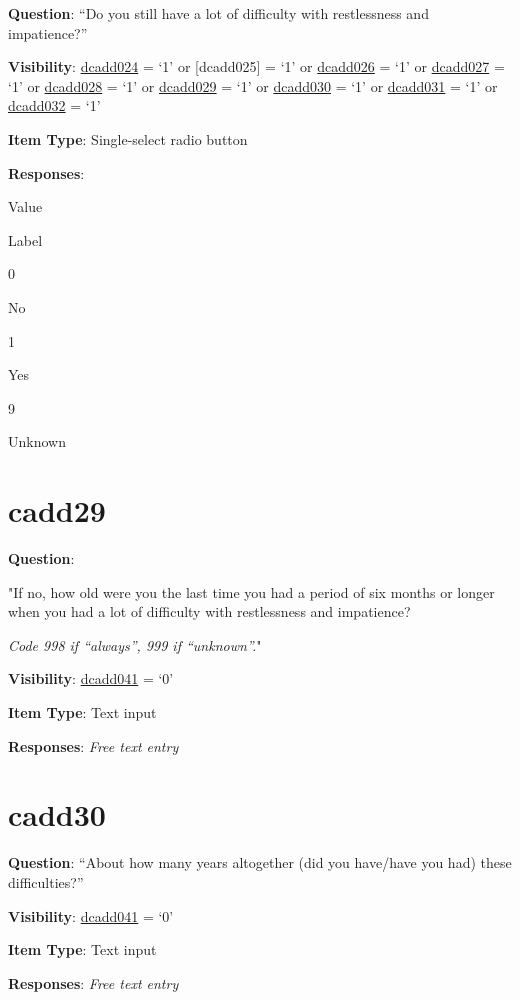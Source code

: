 \documentclass[]{book}
\begin{document}
\textbf{Question}: ``Do you still have a lot of difficulty with restlessness and impatience?''

\textbf{Visibility}: \protect\hyperlink{dcadd024}{dcadd024} = `1' or {[}dcadd025{]} = `1' or \protect\hyperlink{dcadd026}{dcadd026} = `1' or \protect\hyperlink{dcadd027}{dcadd027} = `1' or \protect\hyperlink{dcadd028}{dcadd028} = `1' or \protect\hyperlink{dcadd029}{dcadd029} = `1' or \protect\hyperlink{dcadd030}{dcadd030} = `1' or \protect\hyperlink{dcadd031}{dcadd031} = `1' or \protect\hyperlink{dcadd032}{dcadd032} = `1'

\textbf{Item Type}: Single-select radio button

\textbf{Responses}:

Value

Label

0

No

1

Yes

9

Unknown

\hypertarget{cadd29}{%
\section{cadd29}\label{cadd29}}

\textbf{Question}:

"If no, how old were you the last time you had a period of six months or longer when you had a lot of difficulty with restlessness and impatience?

\emph{Code 998 if ``always'', 999 if ``unknown''.}"

\textbf{Visibility}: \protect\hyperlink{dcadd041}{dcadd041} = `0'

\textbf{Item Type}: Text input

\textbf{Responses}: \emph{Free text entry}

\hypertarget{cadd30}{%
\section{cadd30}\label{cadd30}}

\textbf{Question}: ``About how many years altogether (did you have/have you had) these difficulties?''

\textbf{Visibility}: \protect\hyperlink{dcadd041}{dcadd041} = `0'

\textbf{Item Type}: Text input

\textbf{Responses}: \emph{Free text entry}
\end{document}
